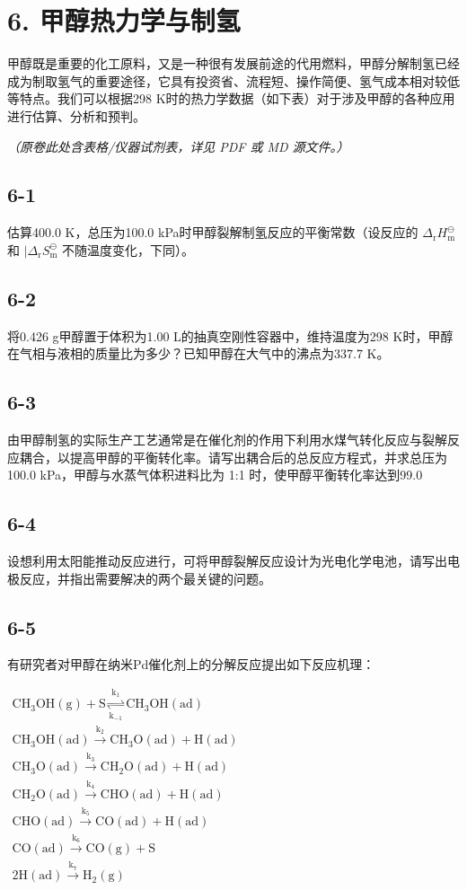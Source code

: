 \section*{6. 甲醇热力学与制氢}
甲醇既是重要的化⼯原料，⼜是⼀种很有发展前途的代⽤燃料，甲醇分解制氢已经成为制取氢⽓的重要途径，它具有投资省、流程短、操作简便、氢⽓成本相对较低等特点。我们可以根据298 K时的热⼒学数据（如下表）对于涉及甲醇的各种应⽤进⾏估算、分析和预判。

\textit{（原卷此处含表格/仪器试剂表，详见 PDF 或 MD 源文件。）}

\subsection*{6-1}
估算400.0 K，总压为100.0 kPa时甲醇裂解制氢反应的平衡常数（设反应的 $\Delta _ { \mathrm { r } } H _ { \mathrm { m } } ^ { \ominus }$ 和 $| \Delta _ { \mathrm { { r } } } S _ { \mathrm { { m } } } ^ { \ominus }$ 不随温度变化，下同）。

\subsection*{6-2}
将0.426 g甲醇置于体积为1.00 L的抽真空刚性容器中，维持温度为298 K时，甲醇在⽓相与液相的质量⽐为多少？已知甲醇在⼤⽓中的沸点为337.7 K。

\subsection*{6-3}
由甲醇制氢的实际⽣产⼯艺通常是在催化剂的作⽤下利⽤⽔煤⽓转化反应与裂解反应耦合，以提⾼甲醇的平衡转化率。请写出耦合后的总反应⽅程式，并求总压为 100.0 kPa，甲醇与⽔蒸⽓体积进料⽐为 1:1 时，使甲醇平衡转化率达到99.0%

\subsection*{6-4}
设想利⽤太阳能推动反应进⾏，可将甲醇裂解反应设计为光电化学电池，请写出电极反应，并指出需要解决的两个最关键的问题。

\subsection*{6-5}
有研究者对甲醇在纳⽶Pd催化剂上的分解反应提出如下反应机理：

$
\begin{array}{c}\mathrm {CH_ {3} OH(g) + S \underset {k _ {- 1}} {\overset {k _ {1}} {\rightleftharpoons}} CH_ {3} OH(ad)}\\\mathrm {CH_ {3} OH(ad) \xrightarrow {k _ {2}} CH_ {3} O(ad) + H(ad)}\\\mathrm {CH_ {3} O(ad) \xrightarrow {k _ {3}} CH_ {2} O(ad) + H(ad)}\\\mathrm {CH_ {2} O(ad) \xrightarrow {k _ {4}} CHO(ad) + H(ad)}\\\mathrm{CHO(ad) \xrightarrow {k _ {5}} CO(ad) + H(ad)}\\\mathrm{CO(ad) \xrightarrow {k _ {6}} CO(g) + S}\\2 \mathrm{H(ad) \xrightarrow {k _ {7}} H_{2} (g)}\end{array}
$

